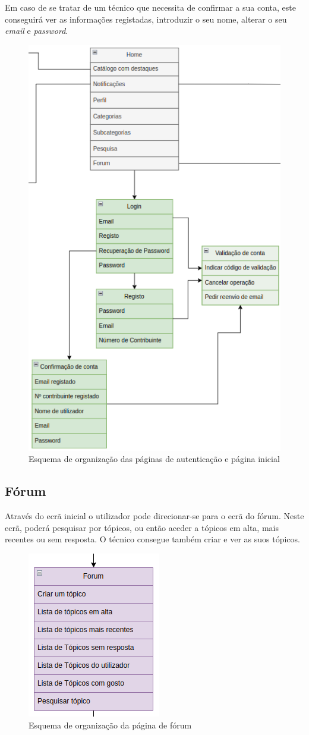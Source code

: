 Em caso de se tratar de um técnico que necessita de confirmar a sua conta, este conseguirá ver as informações registadas, introduzir o seu nome, alterar o seu \textit{email} e \textit{password}.

\begin{figure}[htb]
  \centering
  \includegraphics[height=0.9\textwidth]{images/Arquiteturas/superficial_de_app/home_auth.png}
  \caption{Esquema de organização das páginas de autenticação e página inicial}
  \label{fig:4}
\end{figure}

\newpage

\subsection{Fórum}

Através do ecrã inicial o utilizador pode direcionar-se para o ecrã do fórum. Neste ecrã, poderá pesquisar por tópicos, ou então aceder a tópicos em alta, mais recentes ou sem resposta.
O técnico consegue também criar e ver as suos tópicos.

\begin{figure}[htb]
  \centering
  
  \includegraphics[height=0.4\textwidth]{images/Arquiteturas/superficial_de_app/forum.png}
  \caption{Esquema de organização da página de fórum}
  \label{fig:5}
\end{figure}

